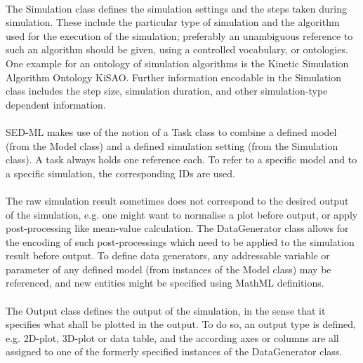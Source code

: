 \paragraph{}
The Simulation class defines the simulation settings and the steps taken during simulation. These include the particular type of simulation and the algorithm used for the execution of the simulation; preferably an unambiguous reference to such an algorithm should be given, using a controlled vocabulary, or ontologies. One example for an ontology of simulation algorithms is the Kinetic Simulation Algorithm Ontology KiSAO. Further information encodable in the Simulation class includes the step size, simulation duration, and other simulation-type dependent information.

\paragraph{}
SED-ML makes use of the notion of a Task class to combine a defined model (from the Model class) and a defined simulation setting (from the Simulation class). A task always holds one reference each. To refer to a specific model and to a specific simulation, the corresponding IDs are used.

\paragraph{}
The raw simulation result sometimes does not correspond to the desired output of the simulation, e.g. one might want to normalise a plot before output, or apply post-processing like mean-value calculation. The DataGenerator class allows for the encoding of such post-processings which need to be applied to the simulation result before output. To define data generators, any addressable variable or parameter of any defined model (from instances of the Model class) may be referenced, and new entities might be specified using MathML definitions.

\paragraph{}
The Output class defines the output of the simulation, in the sense that it specifies what shall be plotted in the output. To do so, an output type is defined, e.g. 2D-plot, 3D-plot or data table, and the according axes or columns are all assigned to one of the formerly specified instances of the DataGenerator class.

